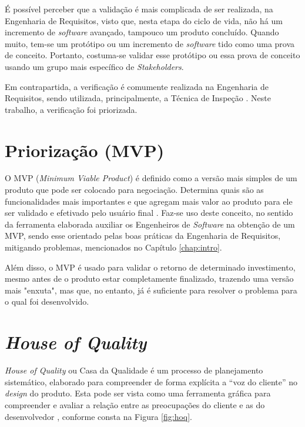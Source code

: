 É possível perceber que a validação é mais complicada de ser realizada, na Engenharia de Requisitos, visto que, nesta etapa do ciclo de vida, não há um incremento de \textit{software} avançado, tampouco um produto concluído. Quando muito, tem-se um protótipo ou um incremento de \textit{software} tido como uma prova de conceito. Portanto, costuma-se validar esse protótipo ou essa prova de conceito usando um grupo mais específico de \textit{Stakeholders}.

Em contrapartida, a verificação é comumente realizada na Engenharia de Requisitos, sendo utilizada, principalmente, a Técnica de Inspeção \cite{design_fagan} \cite{verification_MR}. Neste trabalho, a verificação foi priorizada.

\section{Priorização (MVP)}

\label{sec:priorizacao}

O MVP (\textit{Minimum Viable Product}) é definido como a versão mais simples de um produto que pode ser colocado para negociação. Determina quais são as funcionalidades mais importantes e que agregam mais valor ao produto para ele ser validado e efetivado pelo usuário final \cite{carolipaulo2018}. Faz-se uso deste conceito, no sentido da ferramenta elaborada auxiliar os Engenheiros de \textit{Software} na obtenção de um MVP, sendo esse orientado pelas boas práticas da Engenharia de Requisitos, mitigando problemas, mencionados no Capítulo \ref{chap:intro}.

Além disso, o MVP é usado para validar o retorno de determinado investimento, mesmo antes de o produto estar completamente finalizado, trazendo uma versão mais "enxuta", mas que, no entanto, já é suficiente para resolver o problema para o qual foi desenvolvido.

\section{\textit{House of Quality}}

\label{sec:house_of_quality}

\textit{House of Quality} ou Casa da Qualidade é um processo de planejamento sistemático, elaborado para compreender de forma explícita a “voz do cliente” no \textit{design} do produto. Esta pode ser vista como uma ferramenta gráfica para compreender e avaliar a relação entre as preocupações do cliente e as do desenvolvedor \cite{Howard_1}, conforme consta na Figura \ref{fig:hoq}.

